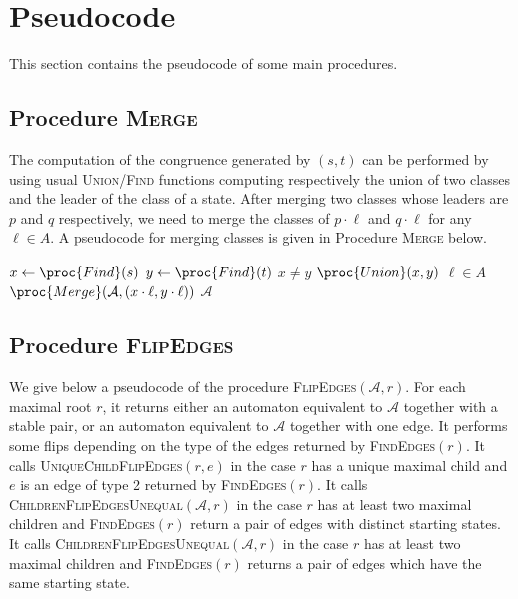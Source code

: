 \documentclass[11pt,a4paper]{article}
\def\A{\mathcal{A}}
\begin{document}
\section{Pseudocode} \label{section.pseudocode}
This section contains the pseudocode of some main procedures.
\subsection{Procedure \textsc{Merge}}

The computation of the congruence generated by $(s,t)$ can be
performed by using usual \textsc{Union/Find} functions computing
respectively the union of two classes and the leader of the class of a
state. After merging two classes whose leaders are $p$ and $q$
respectively, we need to merge the classes of $p \cdot
\ell$ and $q \cdot \ell$ for any $\ell \in A$.  
A pseudocode for merging classes is given in Procedure \textsc{Merge} below. 

\begin{small}
\begin{codebox}
\Procname{$\proc{Merge }(\text{automaton } \A, \text{ stable pair } (s,t))$}
\li  $x \gets \proc{Find}(s)$
\li  $y \gets \proc{Find}(t)$
\li  \If $x \neq y$ 
\li        \Then $\proc{Union}(x,y)$
\li               \For $\ell \in A$ 
\li                   \Do $\proc{Merge}(\A, (x \cdot \ell ,y \cdot \ell))$
                   \End
     \End
\li \Return $\A$
\end{codebox}
\end{small}



\subsection{Procedure \textsc{FlipEdges}}

We give below a pseudocode of the procedure
\textsc{FlipEdges}$(\A,r)$.  For each maximal root $r$, it
returns either an automaton equivalent to $\A$ together with a stable
pair, or an automaton equivalent to $\A$ together with one edge.
It performs some flips depending on the type of the edges returned by
\textsc{FindEdges}$(r)$. It calls \textsc{UniqueChildFlipEdges}$(r,e)$
in the case $r$ has a unique maximal child and $e$ is an edge of type 2
returned by \textsc{FindEdges}$(r)$.  It calls
\textsc{ChildrenFlipEdgesUnequal}$(\A,r)$ in the case $r$ has at least
two maximal children and \textsc{FindEdges}$(r)$ return a pair of
edges with distinct starting states.  It calls
\textsc{ChildrenFlipEdgesUnequal}$(\A,r)$ in the case $r$ has at least
two maximal children and \textsc{FindEdges}$(r)$ returns a pair of
edges which have the same starting state.
\end{document}
